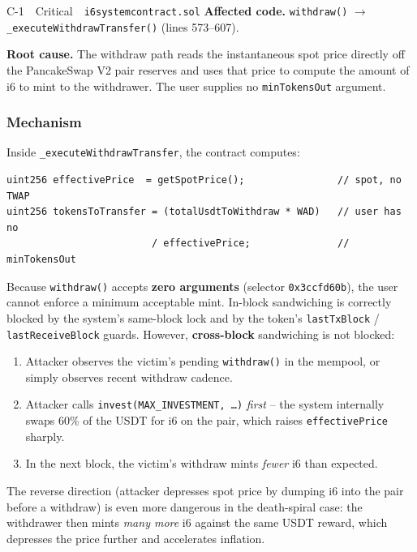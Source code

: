 \documentclass[11pt,a4paper]{article}
\begin{document}
\begin{criticalbox}{C-1 \,\textbar\, Critical \,\textbar\, \texttt{i6systemcontract.sol}}
\textbf{Affected code.} \texttt{withdraw()} $\rightarrow$
\texttt{\_executeWithdrawTransfer()} (lines 573--607).

\textbf{Root cause.} The withdraw path reads the instantaneous spot price
directly off the PancakeSwap V2 pair reserves and uses that price to compute
the amount of i6 to mint to the withdrawer. The user supplies no
\texttt{minTokensOut} argument.
\end{criticalbox}

\subsubsection*{Mechanism}

Inside \texttt{\_executeWithdrawTransfer}, the contract computes:

\begin{lstlisting}[caption={\texttt{i6systemcontract.sol} -- mint formula in withdraw}]
uint256 effectivePrice  = getSpotPrice();                // spot, no TWAP
uint256 tokensToTransfer = (totalUsdtToWithdraw * WAD)   // user has no
                         / effectivePrice;               // minTokensOut
\end{lstlisting}

Because \texttt{withdraw()} accepts \textbf{zero arguments} (selector
\texttt{0x3ccfd60b}), the user cannot enforce a minimum acceptable mint.
In-block sandwiching is correctly blocked by the system's same-block lock and
by the token's \texttt{lastTxBlock} / \texttt{lastReceiveBlock} guards.
However, \textbf{cross-block} sandwiching is not blocked:

\begin{enumerate}[leftmargin=*]
    \item Attacker observes the victim's pending \texttt{withdraw()} in the
          mempool, or simply observes recent withdraw cadence.
    \item Attacker calls
          \texttt{invest(MAX\_INVESTMENT, \dots)} \emph{first} -- the system
          internally swaps 60\% of the USDT for i6 on the pair, which raises
          \texttt{effectivePrice} sharply.
    \item In the next block, the victim's withdraw mints
          \emph{fewer} i6 than expected.
\end{enumerate}

The reverse direction (attacker depresses spot price by dumping i6 into the
pair before a withdraw) is even more dangerous in the death-spiral case: the
withdrawer then mints \emph{many more} i6 against the same USDT reward,
which depresses the price further and accelerates inflation.
\end{document}
